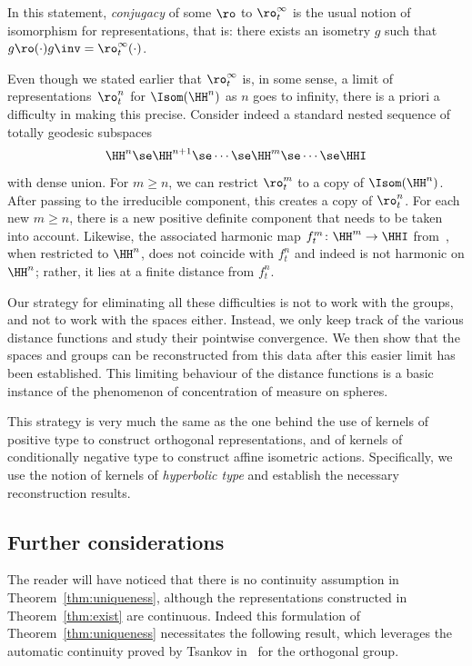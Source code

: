 In this statement, \emph{conjugacy} of some $\ro$ to $\ro^\infty_t$ is the usual notion of isomorphism for representations, that is: there exists an isometry $g$ such that $g\ro(\cdot) g\inv = \ro^\infty_t(\cdot)$.


Even though we stated earlier that $\ro^\infty_t$ is, in some sense, a limit of representations~$\ro^n_t$ for $\Isom(\HH^n)$ as $n$ goes to infinity, there is a priori a difficulty in making this precise. Consider indeed a standard nested sequence of totally geodesic subspaces
\[
\HH^n \se \HH^{n+1} \se \cdots \se \HH^m \se\cdots\se \HHI
\]
with dense union. For $m\ge n$, we can restrict $\ro^m_t$ to a copy of $\Isom(\HH^n)$. After passing to the irreducible component, this creates a copy of $\ro^n_t$. For each new $m\geq n$, there is a new positive definite component that needs to be taken into account. Likewise, the associated harmonic map $f^m_t\colon \HH^m\to\HHI$ from~\cite{Monod-Py}, when restricted to $\HH^n$, does not coincide with $f^n_t$ and indeed is not harmonic on $\HH^n$; rather, it lies at a finite distance from $f^n_t$.

Our strategy for eliminating all these difficulties is not to work with the groups, and not to work with the spaces either. Instead, we only keep track of the various distance functions and study their pointwise convergence. We then show that the spaces and groups can be reconstructed from this data after this easier limit has been established. This limiting behaviour of the distance functions is a basic instance of the phenomenon of concentration of measure on spheres.

This strategy is very much the same as the one behind the use of kernels of positive type to construct orthogonal representations, and of kernels of conditionally negative type to construct affine isometric actions. Specifically, we use the notion of kernels of \emph{hyperbolic type} and establish the necessary reconstruction results.

\subsection{Further considerations}

The reader will have noticed that there is no continuity assumption in Theorem~\ref{thm:uniqueness}, although the representations constructed in Theorem~\ref{thm:exist} are continuous. Indeed this formulation of Theorem~\ref{thm:uniqueness} necessitates the following result, which leverages the automatic continuity proved by Tsankov in~\cite{Tsankov13} for the orthogonal group.

